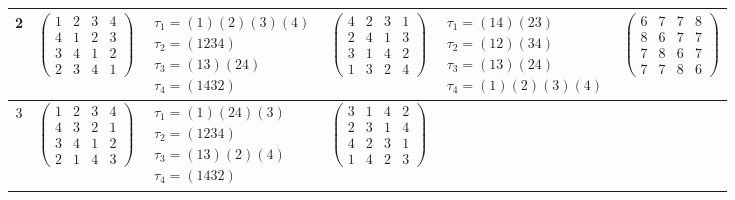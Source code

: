 \begin{longtable}{|c|p{2.7cm}|p{2.7cm}|p{2.7cm}|p{2.7cm}|p{2.7cm}|}
    \hline
    2                                                                                                              &
    $\begin{pmatrix} 1 & 2 & 3 & 4 \\ 4 & 1 & 2 & 3 \\ 3 & 4 & 1 & 2 \\ 2 & 3 & 4 & 1 \end{pmatrix}$               &
    $\begin{array}{l}\tau_{1}=(1)(2)(3)(4)\\ \tau_{2}=(1234)\\ \tau_{3}=(13)(24)\\ \tau_{4}=(1432)\end{array}$     &
    $\begin{pmatrix} 4 & 2 & 3 & 1 \\ 2 & 4 & 1 & 3 \\ 3 & 1 & 4 & 2 \\ 1 & 3 & 2 & 4 \end{pmatrix}$               &
    $\begin{array}{l}\tau_{1}=(14)(23)\\ \tau_{2}=(12)(34)\\ \tau_{3}=(13)(24)\\ \tau_{4}=(1)(2)(3)(4)\end{array}$ &
    $\begin{pmatrix} 6 & 7 & 7 & 8 \\ 8 & 6 & 7 & 7 \\ 7 & 8 & 6 & 7 \\ 7 & 7 & 8 & 6 \end{pmatrix}$                                                                                           \\
    \hline
    3                                                                                                              &
    $\begin{pmatrix} 1 & 2 & 3 & 4 \\ 4 & 3 & 2 & 1 \\ 3 & 4 & 1 & 2 \\ 2 & 1 & 4 & 3 \end{pmatrix}$               &
    $\begin{array}{l}\tau_{1}=(1)(24)(3)\\ \tau_{2}=(1234)\\ \tau_{3}=(13)(2)(4)\\ \tau_{4}=(1432)\end{array}$     &
    $\begin{pmatrix} 3 & 1 & 4 & 2 \\ 2 & 3 & 1 & 4 \\ 4 & 2 & 3 & 1 \\ 1 & 4 & 2 & 3 \end{pmatrix}$               &

\end{longtable}
